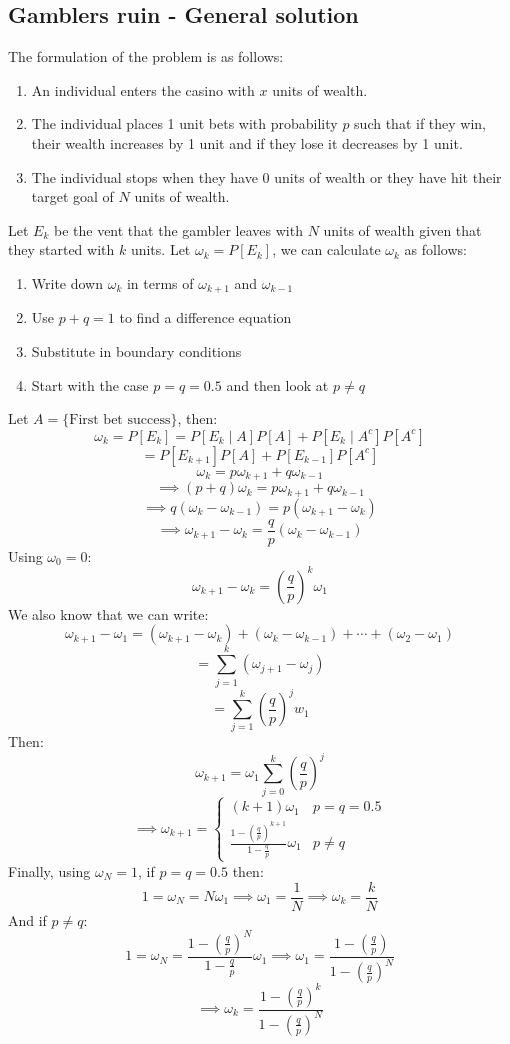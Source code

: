 \documentclass[12pt]{article}
\begin{document}
\subsection*{Gamblers ruin - General solution}
The formulation of the problem is as follows:
\begin{enumerate}
    \item An individual enters the casino with \(x\) units of wealth.
    \item The individual places 1 unit bets with probability \(p\) such that if they win, their wealth increases by 1 unit and if they lose it decreases by 1 unit.
    \item The individual stops when they have 0 units of wealth or they have hit their target goal of \(N\) units of wealth.
\end{enumerate}
Let \(E_k\) be the vent that the gambler leaves with \(N\) units of wealth given that they started with \(k\) units. Let \(\omega_k=P[E_k]\), we can calculate \(\omega_k\) as follows:
\begin{enumerate}
    \item Write down \(\omega_k\) in terms of \(\omega_{k+1}\) and \(\omega_{k-1}\)
    \item Use \(p+q=1\) to find a difference equation
    \item Substitute in boundary conditions
    \item Start with the case \(p=q=0.5\) and then look at \(p\ne q\)
\end{enumerate}
Let \(A=\{\text{First bet success}\}\), then:
\[\omega_k=P[E_k]=P[E_k\mid A]P[A]+P[E_k\mid A^c]P[A^c]\]
\[=P[E_{k+1}]P[A]+P[E_{k-1}]P[A^c]\]
\[\omega_k=p\omega_{k+1}+q\omega_{k-1}\]
\[\implies (p+q)\omega_k=p\omega_{k+1}+q\omega_{k-1}\]
\[\implies q(\omega_k-\omega_{k-1})=p(\omega_{k+1}-\omega_k)\]
\[\implies \omega_{k+1}-\omega_k=\frac{q}{p}(\omega_k-\omega_{k-1})\]
Using \(\omega_0=0\):
\[\omega_{k+1}-\omega_k=\left(\frac{q}{p}\right)^k\omega_1\]
We also know that we can write:
\[\omega_{k+1}-\omega_1=(\omega_{k+1}-\omega_k)+(\omega_k-\omega_{k-1})+\cdots + (\omega_2-\omega_1)\]
\[=\sum^k_{j=1}(\omega_{j+1}-\omega_j)\]
\[=\sum^k_{j=1}\left(\frac{q}{p}\right)^jw_1\]
Then:
\[\omega_{k+1}=\omega_1\sum^k_{j=0}\left(\frac{q}{p}\right)^j\]
\[\implies \omega_{k+1}=\begin{cases}
    (k+1)\omega_1 & p=q=0.5 \\
    \frac{1-\left(\frac{q}{p}\right)^{k+1}}{1-\frac{q}{p}}\omega_1 & p\ne q
\end{cases}\]
Finally, using \(\omega_N=1\), if \(p=q=0.5\) then:
\[1=\omega_N=N\omega_1\implies \omega_1=\frac{1}{N}\implies \omega_k=\frac{k}{N}\]
And if \(p\ne q\):
\[1=\omega_N=\frac{1-\left(\frac{q}{p}\right)^{N}}{1-\frac{q}{p}}\omega_1\implies\omega_1=\frac{1-\left(\frac{q}{p}\right)}{1-\left(\frac{q}{p}\right)^N}\]
\[\implies \omega_k=\frac{1-\left(\frac{q}{p}\right)^k}{1-\left(\frac{q}{p}\right)^N}\]
\end{document}
